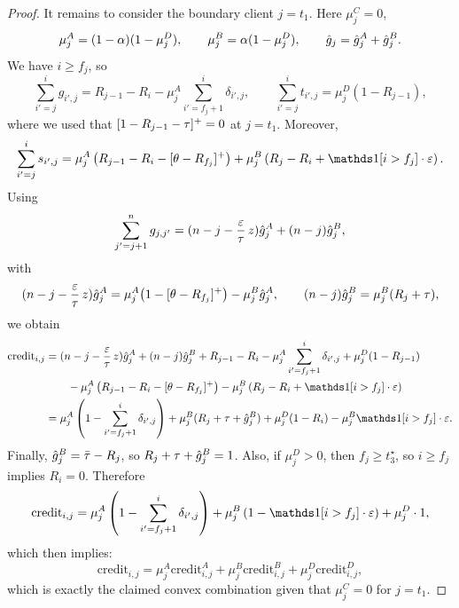 \begin{proof}
    It remains to consider the boundary client $j=t_1$. Here $\mu_j^C=0$,
    \begin{equation*}
        \mu_j^A=(1-\alpha)(1-\mu_j^D),
        \qquad
        \mu_j^B=\alpha(1-\mu_j^D),
        \qquad
        \hat{g}_j=\hat{g}_j^A+\hat{g}_j^B.
    \end{equation*}
    We have $i\ge f_j$, so
    \begin{equation*}
        \sum_{i'=j}^{i} g_{i',j}=R_{j-1}-R_i-\mu_j^A\sum_{i'=f_j+1}^{i}\delta_{i',j},
        \qquad
        \sum_{i'=j}^{i} t_{i',j}=\mu_j^D(1-R_{j-1}),
    \end{equation*}
    where we used that $[1-R_{j-1}-\tau]^+=0$ at $j=t_1$.
    Moreover,
    \begin{equation*}
        \sum_{i'=j}^{i} s_{i',j}
        = \mu_j^A\left(R_{j-1}-R_i-[\MRttwo-R_{f_j}]^+\right)
        + \mu_j^B\left(R_j-R_i+\ind[i>f_j]\cdot\Mcoeffmone\right).
    \end{equation*}
    Using
    \begin{equation*}
        \sum_{j'=j+1}^{n} g_{j,j'}=(n-j-\frac{\varepsilon}{\tau}\, z)\hat{g}_j^A+(n-j)\hat{g}_j^B,
    \end{equation*}
    with
    \begin{equation*}
        (n-j-\frac{\varepsilon}{\tau}\, z)\hat{g}_j^A=
        \mu_j^A\bigl(1-[\theta-R_{f_j}]^+\bigr)-\mu_j^B\hat{g}_j^A,
        \qquad
        (n-j)\hat{g}_j^B=
        \mu_j^B(R_j+\tau),
    \end{equation*}
    we obtain
    \begin{align*}
        \text{credit}_{i,j}
        &= (n-j-\Mfrac\, z)\hg_j^A+(n-j)\hg_j^B + R_{j-1}-R_i - \mu_j^A\sum_{i'=f_j+1}^{i}\delta_{i',j} + \mu_j^D(1-R_{j-1}) \\
        &\qquad - \mu_j^A\left(R_{j-1}-R_i-[\MRttwo-R_{f_j}]^+\right)
        - \mu_j^B\left(R_j-R_i+\ind[i>f_j]\cdot\Mcoeffmone\right) \\
        &= \mu_j^A\left(1-\sum_{i'=f_j+1}^{i}\delta_{i',j}\right)
        + \mu_j^B(R_j+\Mtone+\hg_j^B)
        + \mu_j^D(1-R_i)
        - \mu_j^B\ind[i>f_j]\cdot\Mcoeffmone.
    \end{align*}
    Finally, $\hat{g}_j^B=\bar\tau - R_j$, so $R_j+\tau+\hat{g}_j^B=1$. Also, if $\mu_j^D>0$, then $f_j\geq t_3^\star$, so $i\ge f_j$ implies $R_i=0$. Therefore
    \begin{equation*}
        \text{credit}_{i,j}
        = \mu_j^A\left(1-\sum_{i'=f_j+1}^{i}\delta_{i',j}\right)
        + \mu_j^B\left(1-\ind[i>f_j]\cdot\Mcoeffmone\right)
        + \mu_j^D\cdot 1,
    \end{equation*}
    which then implies:
    \begin{equation*}
        \text{credit}_{i,j}
        = \mu_j^A\text{credit}_{i,j}^A
        + \mu_j^B\text{credit}_{i,j}^B
        + \mu_j^D\text{credit}_{i,j}^D,
    \end{equation*}
    which is exactly the claimed convex combination given that $\mu_j^C=0$ for $j=t_1$.
\end{proof}

